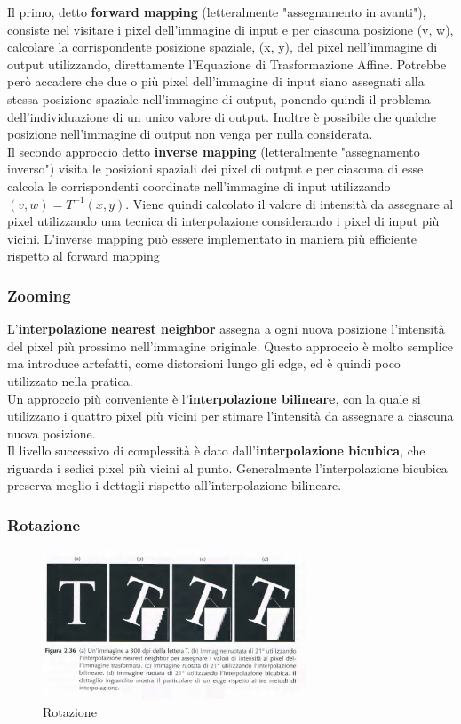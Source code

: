 \documentclass[12pt]{article}
\begin{document}
Il primo, detto \textbf{forward mapping} (letteralmente "assegnamento in avanti"), consiste nel visitare i pixel dell'immagine di input e per ciascuna posizione (v, w), calcolare la corrispondente posizione spaziale, (x, y), del pixel nell'immagine di output utilizzando, direttamente l'Equazione di Trasformazione Affine. Potrebbe però accadere che due o più pixel dell'immagine di input siano assegnati alla stessa posizione spaziale nell'immagine di output, ponendo quindi il problema dell'individuazione di un unico valore di output. Inoltre è possibile che qualche posizione nell'immagine di output non venga per nulla considerata.\\ Il secondo approccio detto \textbf{inverse mapping} (letteralmente "assegnamento inverso") visita le posizioni spaziali dei pixel di output e per ciascuna di esse calcola le corrispondenti coordinate nell'immagine di input utilizzando $(v, w) = T^{-1}(x, y)$. Viene quindi calcolato il valore di intensità da assegnare al pixel utilizzando una tecnica di interpolazione considerando i pixel di input più vicini. L'inverse mapping può essere implementato in maniera più efficiente rispetto al forward mapping
\subsubsection{Zooming}
L'\textbf{interpolazione nearest neighbor} assegna a ogni nuova posizione l'intensità del pixel più prossimo nell'immagine originale. Questo approccio è molto semplice ma introduce artefatti, come distorsioni lungo gli edge, ed è quindi poco utilizzato nella pratica.\\
Un approccio più conveniente è l'\textbf{interpolazione bilineare}, con la quale si utilizzano i quattro pixel più vicini per stimare l'intensità da assegnare a ciascuna nuova posizione.\\
Il livello successivo di complessità è dato dall'\textbf{interpolazione bicubica}, che riguarda i sedici pixel più vicini al punto. Generalmente l'interpolazione bicubica preserva meglio i dettagli rispetto all'interpolazione bilineare.
\subsubsection{Rotazione}
\begin{figure}[!htb]
    \centering
    \includegraphics[width=0.7\textwidth]{Images/rot.png}
    \caption{Rotazione}
\end{figure}
\FloatBarrier
\end{document}
